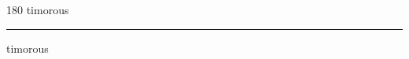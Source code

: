 
\begin{frame}
\begin{center}
\begin{turn}{180}
{\fontsize{2.5cm}{1em}\selectfont timorous}
\end{turn}
\vspace{1em}\par  
\hrule
\vspace{1em}\par  
{\fontsize{2.5cm}{1em}\selectfont timorous}
\end{center}
\end{frame}
